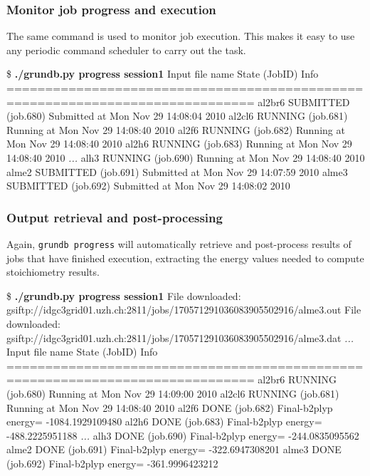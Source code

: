 \documentclass {beamer}
\newcommand{\largeskip}{\vspace{1em}}
\def\+{\largeskip}
\begin{document}
\begin{frame}[fragile]
  \frametitle{Monitor job progress and execution}

  The same command is used to monitor job execution.  This makes it
  easy to use any periodic command scheduler to carry out the task.
  \+
  \begin{footnotesize}
\begin{semiverbatim}
\$ {\bf ./grundb.py progress session1}
Input file name  State (JobID)       Info
==============================================================================
al2br6           SUBMITTED (job.680)  Submitted at Mon Nov 29 14:08:04 2010
al2cl6           RUNNING (job.681)   Running at Mon Nov 29 14:08:40 2010
al2f6            RUNNING (job.682)   Running at Mon Nov 29 14:08:40 2010
al2h6            RUNNING (job.683)   Running at Mon Nov 29 14:08:40 2010
  {\em ...}
alh3             RUNNING (job.690)   Running at Mon Nov 29 14:08:40 2010
alme2            SUBMITTED (job.691)  Submitted at Mon Nov 29 14:07:59 2010
alme3            SUBMITTED (job.692)  Submitted at Mon Nov 29 14:08:02 2010
\end{semiverbatim}    
  \end{footnotesize}
\end{frame}

\begin{frame}[fragile]
  \frametitle{Output retrieval and post-processing}

  Again, \texttt{grundb progress} will automatically retrieve and
  post-process results of jobs that have finished execution,
  extracting the energy values needed to compute stoichiometry results.
  \+
  \begin{footnotesize}
\begin{semiverbatim}
\$ {\bf ./grundb.py progress session1}
File downloaded: gsiftp://idgc3grid01.uzh.ch:2811/jobs/170571291036083905502916/alme3.out
File downloaded: gsiftp://idgc3grid01.uzh.ch:2811/jobs/170571291036083905502916/alme3.dat
  {\em ...}
Input file name  State (JobID)       Info
==============================================================================
al2br6           RUNNING (job.680)   Running at Mon Nov 29 14:09:00 2010
al2cl6           RUNNING (job.681)   Running at Mon Nov 29 14:08:40 2010
al2f6            DONE (job.682)      Final-b2plyp energy= -1084.1929109480 
al2h6            DONE (job.683)      Final-b2plyp energy= -488.2225951188 
  {\em ...}
alh3             DONE (job.690)      Final-b2plyp energy= -244.0835095562 
alme2            DONE (job.691)      Final-b2plyp energy= -322.6947308201 
alme3            DONE (job.692)      Final-b2plyp energy= -361.9996423212 
\end{semiverbatim}    
  \end{footnotesize}
\end{frame}
\end{document}
